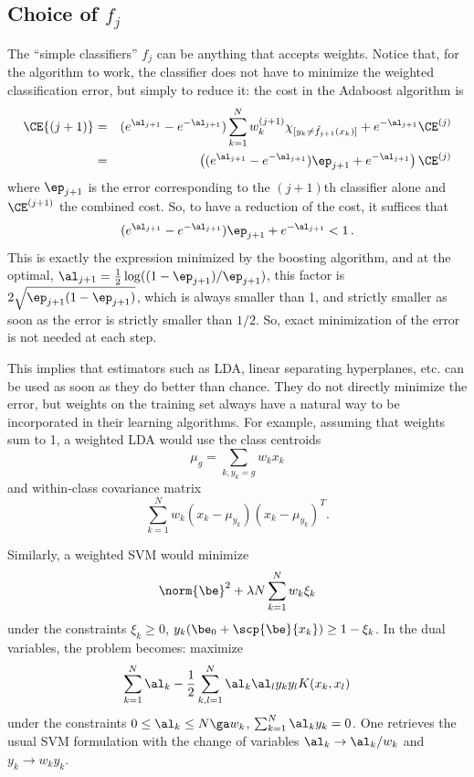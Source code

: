 \subsection{Choice of $f_j$}
The ``simple classifiers'' $f_j$ can be anything that accepts
weights. Notice that, for the algorithm to work, the
classifier does not have to minimize the weighted  classification error, but
simply to reduce it: the cost in the Adaboost algorithm is 
\begin{eqnarray*}
\CE{(j+1)}  &=& (e^{\al_{j+1}} - e^{-\al_{j+1}}) \sum_{k=1}^N w_k^{(j+1)} \chi_{[y_k
\neq \tilde f_{j+1}(x_k)]} + e^{-\al_{j+1}} \CE^{(j)}\\
&=&  \left((e^{\al_{j+1}} - e^{-\al_{j+1}}) \ep_{j+1} +
e^{-\al_{j+1}}\right)\CE^{(j)}
\end{eqnarray*}
where $\ep_{j+1}$ is the error corresponding to the $(j+1)$th
classifier alone and $\CE^{(j+1)}$ the combined cost. So, to have a
reduction of the cost, it suffices that 
$$(e^{\al_{j+1}} - e^{-\al_{j+1}}) \ep_{j+1} +
e^{-\al_{j+1}} < 1\,.$$
This is exactly the expression minimized by the boosting algorithm, and
at the optimal, $\al_{j+1} = \frac{1}{2}
\log((1-\ep_{j+1})/\ep_{j+1})$, this factor is $2
\sqrt{\ep_{j+1}(1-\ep_{j+1})}$, which is always smaller than 1, and
strictly smaller as soon as the error is strictly smaller than
$1/2$. So, exact minimization of the error is not needed at each step.

This implies that estimators such as LDA, linear separating hyperplanes,
etc. can be used as soon as they do better than chance. They do not
directly minimize the error, but weights on the training set always
have a natural way to be incorporated in their learning algorithms. For
example, assuming that weights sum to 1, a weighted LDA would use the class
centroids
$$
\mu_g = \sum_{k, y_k=g} w_k x_k
$$
and within-class covariance matrix
$$
\sum_{k=1}^N w_k (x_k - \mu_{y_k})(x_k - \mu_{y_k})^T.
$$ 

Similarly, a weighted SVM would minimize
$$
\norm{\be}^2 + \lambda N \sum_{k=1}^N w_k \xi_k
$$
under the constraints $\xi_k \geq 0$, $y_k(\be_0 + \scp{\be}{x_k})
\geq 1 - \xi_k$. In the dual variables, the problem becomes: maximize
$$
\sum_{k=1}^N \al_k - \frac{1}{2} \sum_{k,l=1}^N \al_k\al_l y_ky_l
K(x_k, x_l)
$$
under the constraints $0\leq \al_k\leq N\ga w_k$, $\sum_{k=1}^N \al_k y_k =
0$. One retrieves the usual SVM formulation with the change of
variables $\al_k \to \al_k/w_k$ and $y_k \to w_ky_k$.

